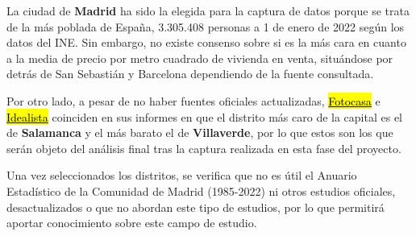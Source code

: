 \documentclass[12pt]{article}
\begin{document}
La ciudad de \textbf{Madrid} ha sido la elegida para la captura de datos porque se trata de la más poblada de España, 3.305.408 personas a 1 de enero de 2022 según los datos del INE. Sin embargo, no existe consenso sobre si es la más cara en cuanto a la media de precio por metro cuadrado de vivienda en venta, situándose por detrás de San Sebastián y Barcelona dependiendo de la fuente consultada. 

Por otro lado, a pesar de no haber fuentes oficiales actualizadas, \href{https://www.fotocasa.es/fotocasa-life/compraventa/conoce-el-precio-de-la-vivienda-en-venta-este-mes/}{\hl{Fotocasa}} e \href{https://www.idealista.com/sala-de-prensa/informes-precio-vivienda/venta/madrid-comunidad/madrid-provincia/madrid/}{\hl{Idealista}} coinciden en sus informes en que el distrito más caro de la capital es el de \textbf{Salamanca} y el más barato el de \textbf{Villaverde}, por lo que estos son los que serán objeto del análisis final tras la captura realizada en esta fase del proyecto.

Una vez seleccionados los distritos, se verifica que no es útil el Anuario Estadístico de la Comunidad de Madrid (1985-2022) ni otros estudios oficiales, desactualizados o que no abordan este tipo de estudios, por lo que permitirá aportar conocimiento sobre este campo de estudio. 
\end{document}
